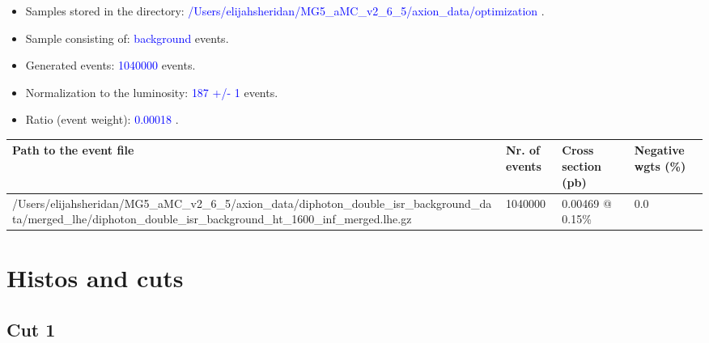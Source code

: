 \documentclass[a4paper, 10pt]{article}
\begin{document}
\begin{itemize}
  \item Samples stored in the directory: \textcolor{blue}{/\-Users/\-elijahsheridan/\-MG5\_aMC\_v2\_6\_5/\-axion\_data/\-optimization} .
   \item Sample consisting of: \textcolor{blue}{background}  events.
   \item Generated events: \textcolor{blue}{1040000 }  events.
   \item Normalization to the luminosity: \textcolor{blue}{187}\textcolor{blue}{ +/\-- }\textcolor{blue}{1 }  events.
   \item Ratio (event weight): \textcolor{blue}{0.00018 } .  
 
\end{itemize}
\begin{table}[H]
  \begin{center}
    \begin{tabular}{|m{55.0mm}|m{25.0mm}|m{30.0mm}|m{30.0mm}|}
      \hline
      {\cellcolor{yellow}         Path to the event file}& {\cellcolor{yellow}         Nr. of events}& {\cellcolor{yellow}         Cross section (pb)}& {\cellcolor{yellow}         Negative wgts (\%)}\\
      \hline
      {\cellcolor{white}          /\-Users/\-elijahsheridan/\-MG5\_aMC\_v2\_6\_5/\-axion\_data/\-diphoton\_double\_isr\_background\_data/\-merged\_lhe/\-diphoton\_double\_isr\_background\_ht\_1600\_inf\_merged.lhe.gz}& {\cellcolor{white}          1040000}& {\cellcolor{white}          0.00469 @ 0.15\%}& {\cellcolor{white}          0.0}\\
\hline
    \end{tabular}
  \end{center}
\end{table}

\newpage
\section{ Histos and cuts}

\subsection{Cut 1}
\end{document}
